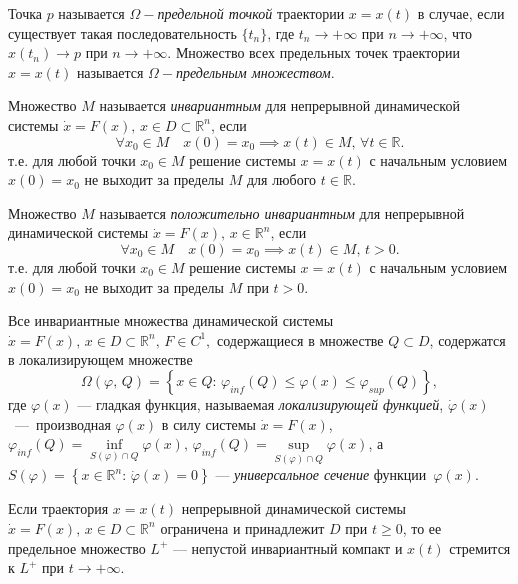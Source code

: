 \documentclass[14pt,a4paper]{extarticle}
\begin{document}
	\begin{definition}
		Точка $p$ называется \textit{$\Omega-$предельной точкой} траектории $x=x(t)$ в случае, если существует такая последовательность $\{t_n\}$, где $t_n\rightarrow+\infty$ при $n\rightarrow+\infty$, что $x(t_n)\rightarrow p$ при $n\rightarrow+\infty$. Множество всех предельных точек траектории $x=x(t)$ называется \textit{$\Omega-$предельным множеством}.
	\end{definition}
	
	\begin{definition}
		Множество $M$ называется \textit{инвариантным} для непрерывной динамической системы $\dot{x} = F(x),\, x\in D\subset\mathbb{R}^n$, если 
		\[\forall{}x_0\in{}M\quad x(0)=x_0\implies{}x(t)\in{}M,\,\forall{}t\in\mathbb{R}.\]
		т.е. для любой точки $x_0\in M$ решение системы $x=x(t)$ с начальным условием $x(0) = x_0$ не выходит за пределы $M$ для любого $t\in\mathbb{R}$.
	\end{definition}
	
	\begin{definition}
		Множество $M$ называется \textit{положительно инвариантным} для непрерывной динамической системы $\dot{x} = F(x),\, x\in\mathbb{R}^n$, если 
		\[\forall{}x_0\in{}M\quad x(0)=x_0\implies{}x(t)\in{}M,\, t>0.\]
		т.е. для любой точки $x_0\in M$ решение системы $x=x(t)$ с начальным условием $x(0) = x_0$ не выходит за пределы $M$ при $t>0$.
	\end{definition}
	
	\begin{theorem}\cite[c.~20]{invar_comp}
		Все инвариантные множества динамической системы $\dot{x} = F(x),\, x\in D\subset\mathbb{R}^n,\, F\in C^1,$ содержащиеся в множестве $Q\subset D$, содержатся в локализирующем множестве
		\[\Omega(\varphi,\, Q) = \left\{x\in Q:\, \varphi_{inf}(Q)\le \varphi(x) \le \varphi_{sup}(Q)\right\},\]
		где $\varphi(x)$ --- гладкая функция, называемая \textit{локализирующей функцией}, $\dot{\varphi}(x)$~---~производная $\varphi(x)$ в силу системы $\dot{x}=F(x)$,   $\varphi_{inf}(Q) = \inf\limits_{S(\varphi)\cap Q}\varphi(x),\,\varphi_{inf}(Q) = \sup\limits_{S(\varphi)\cap Q}\varphi(x)$, а $S(\varphi) = \left\{x\in\mathbb{R}^n:\, \dot{\varphi}(x)=0\right\}$ --- \textit{универсальное сечение} функции~$\varphi(x)$.
	\end{theorem}
	
	\begin{theorem}\cite[c.~114]{Khalil}
		Если траектория $x=x(t)$ непрерывной динамической системы $\dot{x}=F(x),\, x\in D\subset\mathbb{R}^n$ ограничена и принадлежит $D$ при $t \ge 0$, то ее предельное множество $L^+$ --- непустой инвариантный компакт и $x(t)$ стремится к $L^+$ при $t\rightarrow+\infty$.
	\end{theorem}
	
\end{document}

